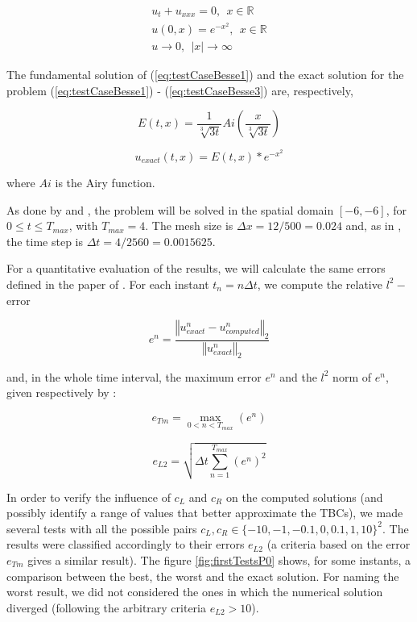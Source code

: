 \begin{gather}
\label{eq:testCaseBesse1}
 u_t + u_{xxx} = 0, \ \ x \in \mathbb{R} \\
 \label{eq:testCaseBesse2}
 u(0,x) = e^{-x^2}, \ \ x \in \mathbb{R}  \\
 \label{eq:testCaseBesse3}
 u \rightarrow 0, \ \ |x| \rightarrow \infty
\end{gather}

\indent The fundamental solution of (\ref{eq:testCaseBesse1}) and  the exact solution for the problem (\ref{eq:testCaseBesse1}) - (\ref{eq:testCaseBesse3}) are, respectively, 

\begin{equation}
    E(t,x) = \frac{1}{\sqrt[3]{3t}}Ai\left(\frac{x}{\sqrt[3]{3t}} \right)
\end{equation}

\begin{equation}
	\label{eq:exactSolution}
    u_{exact}(t,x) = E(t,x) * e^{-x^2}
\end{equation}

\noindent where $Ai$ is the Airy function.

\indent As done by \cite{zheng2008} and \cite{besse2015}, the problem will be solved in the spatial domain $[-6,-6]$, for $0 \leq t \leq T_{max}$, with $T_{max} = 4$. The mesh size is $\Delta x = 12/500 = 0.024$ and, as in \cite{besse2015}, the time step is $\Delta t = 4/2560 = 0.0015625$.

\indent For a quantitative evaluation of the results, we will calculate the same errors defined in the paper of \cite{besse2015}. For each instant $t_n = n\Delta t$, we compute the relative $l^2-$error

$$e^n = \frac{\left\Vert u_{exact}^n - u_{computed}^n\right\Vert_2}{\left\Vert u_{exact}^n\right\Vert_2}$$

\noindent and, in the whole time interval, the maximum error $e^n$ and the $l^2$ norm of $e^n$, given respectively by :

$$ e_{Tm} = \max\limits_{0 < n < T_{max}} (e^n) $$

$$ e_{L2} = \sqrt{ \Delta t \sum_{n=1}^{T_{max}} (e^n)^2 } $$

\indent In order to verify the influence of $c_L$ and $c_R$ on the computed solutions (and possibly identify a range of values that better approximate the TBCs), we made several tests with all the possible pairs $c_L,c_R \in \{-10,-1,-0.1,0,0.1,1,10\}^2$. The results were classified accordingly to their errors $e_{L2}$ (a criteria based on the error $e_{Tm}$ gives a similar result). The figure \ref{fig:firstTestsP0} shows, for some instants, a comparison between the best, the worst and the exact solution. For naming the worst result, we did not considered the ones in which the numerical solution diverged (following the arbitrary criteria $e_{L2} > 10$). 

